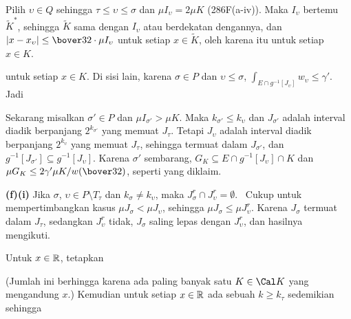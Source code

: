 {

\noindent Pilih $\upsilon\in Q$ sehingga $\tau\le\upsilon\le\sigma$
dan $\mu I_{\upsilon}=2\mu K$ (286F(a-iv)). Maka $I_{\upsilon}$ bertemu
$\tilde K^*$, sehingga $\tilde K$ sama dengan $I_{\upsilon}$ atau berdekatan
dengannya, dan $|x-x_{\upsilon}|\le\bover32\cdot\mu I_{\upsilon}$ untuk setiap
$x\in\tilde K$, oleh karena itu untuk setiap $x\in K$.


\noindent untuk setiap $x\in K$. Di sisi lain, karena $\sigma\in P$ dan
$\upsilon\le\sigma$, $\int_{E\cap
g^{-1}[J_{\upsilon}]}w_{\upsilon}\le\gamma'$. Jadi


Sekarang misalkan $\sigma'\in P$ dan $\mu I_{\sigma'}>\mu K$. Maka
$k_{\sigma'}\le k_{\upsilon}$ dan $J_{\sigma'}$ adalah interval diadik
berpanjang $2^{k_{\sigma'}}$ yang memuat $J_{\tau}$. Tetapi $J_{\upsilon}$ adalah
interval diadik berpanjang $2^{k_{\upsilon}}$ yang memuat $J_{\tau}$, sehingga
termuat dalam $J_{\sigma'}$, dan $g^{-1}[J_{\sigma'}]\subseteq
g^{-1}[J_{\upsilon}]$. Karena $\sigma'$ sembarang, $G_K\subseteq
E\cap g^{-1}[J_{\upsilon}]\cap K$ dan $\mu G_K\le 2\gamma'\mu K/w(\bover32)$,
seperti yang diklaim.\ \Qed

\medskip

{\bf (f)(i)} Jika $\sigma$, $\upsilon\in P\setminus T_{\tau}$ dan
$k_{\sigma}\ne k_{\upsilon}$, maka $J^r_{\sigma}\cap
J^r_{\upsilon}=\emptyset$. \Prf\ Cukup untuk mempertimbangkan kasus $\mu
J_{\sigma}<\mu J_{\upsilon}$, sehingga $\mu J_{\sigma}\le\mu J^r_{\upsilon}$.
Karena $J_{\sigma}$ termuat dalam $J_{\tau}$, sedangkan $J^r_{\upsilon}$ tidak,
$J_{\sigma}$ saling lepas dengan $J^r_{\upsilon}$, dan hasilnya mengikuti.\ \Qed

\medskip

 Untuk $x\in\Bbb R$, tetapkan


\noindent (Jumlah ini berhingga karena ada paling banyak satu $K\in\Cal K$
yang mengandung $x$.) Kemudian untuk setiap $x\in\Bbb R$ ada sebuah $k\ge
k_{\tau}$ sedemikian sehingga

}
